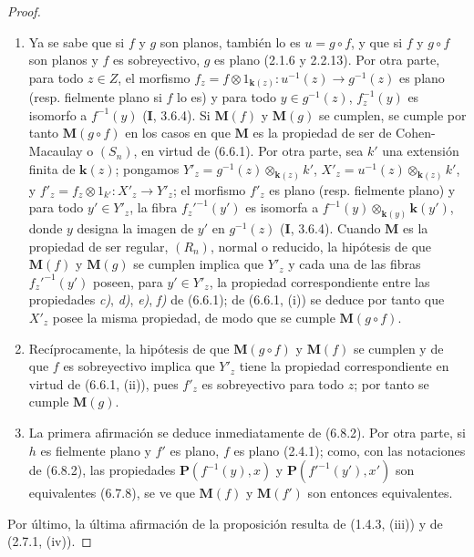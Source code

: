 \begin{proof}
\begin{enumerate}
\item[(i)] Ya se sabe que si $f$ y $g$ son planos, también lo es
$u=g\circ f$, y que si $f$ y $g\circ f$ son planos y $f$ es sobreyectivo, $g$ es
plano (2.1.6 y 2.2.13). Por otra parte, para todo $z\in Z$, el morfismo
$f_z=f\otimes1_{\mathbf{k}(z)}:u^{-1}(z)\to g^{-1}(z)$ es plano (resp.
fielmente plano si $f$ lo es) y para todo $y\in g^{-1}(z)$,
$f_z^{-1}(y)$ es isomorfo a $f^{-1}(y)$ (\textbf{I}, 3.6.4). Si $\boldsymbol{M}(f)$ y $\boldsymbol{M}(g)$
se cumplen, se cumple por tanto $\boldsymbol{M}(g\circ f)$ en los casos en que $\boldsymbol{M}$ es la propiedad
de ser de Cohen-Macaulay o $(S_n)$, en virtud de (6.6.1). Por otra parte, sea
$k'$ una extensión finita de $\boldsymbol{k}(z)$; pongamos
$Y'_z=g^{-1}(z)\otimes_{\mathbf{k}(z)}k'$, $X'_z=u^{-1}(z)\otimes_{\mathbf{k}(z)}k'$, y
$f'_z=f_z\otimes1_{k'}:X'_z\to Y'_z$; el morfismo $f'_z$
es plano
(resp. fielmente plano) y para todo $y'\in Y'_z$, la fibra $f_z'^{-1}(y')$
es isomorfa a $f^{-1}(y)\otimes_{\mathbf{k}(y)}\boldsymbol{k}(y')$, donde $y$ designa la imagen
de $y'$ en $g^{-1}(z)$ (\textbf{I}, 3.6.4). Cuando $\boldsymbol{M}$ es la propiedad de ser
regular, $(R_n)$, normal o reducido, la hipótesis de que $\boldsymbol{M}(f)$ y $\boldsymbol{M}(g)$
se cumplen implica que $Y'_z$ y cada una de las fibras $f_z'^{-1}(y')$ poseen,
para $y'\in Y'_z$, la propiedad correspondiente entre las propiedades \emph{c)}, \emph{d)},
\emph{e)}, \emph{f)} de (6.6.1); de (6.6.1, (i)) se deduce por tanto que $X'_z$ posee la misma
propiedad, de modo que se cumple $\boldsymbol{M}(g\circ f)$.
\item[(ii)] Recíprocamente, la hipótesis de que $\boldsymbol{M}(g\circ f)$ y $\boldsymbol{M}(f)$ se cumplen
y de que $f$ es sobreyectivo implica que $Y'_z$ tiene la propiedad correspondiente en
virtud de (6.6.1, (ii)), pues $f'_z$ es sobreyectivo para todo $z$; por tanto se cumple
$\boldsymbol{M}(g)$.
\item[(iii)] La primera afirmación se deduce inmediatamente de (6.8.2). Por otra parte,
si $h$ es fielmente plano y $f'$ es plano, $f$ es plano (2.4.1); como, con las
notaciones de (6.8.2), las propiedades $\boldsymbol{P}(f^{-1}(y),x)$ y
$\boldsymbol{P}(f'^{-1}(y'),x')$ son equivalentes (6.7.8), se ve que $\boldsymbol{M}(f)$ y $\boldsymbol{M}(f')$
son entonces equivalentes.
\end{enumerate}

Por último, la última afirmación de la proposición resulta de (1.4.3, (iii)) y
de (2.7.1, (iv)).
\end{proof}
